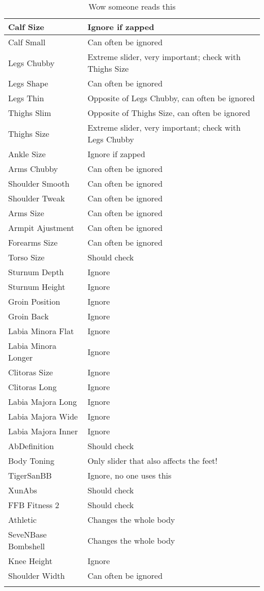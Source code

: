 \begin{longtable}{| p{} | p{} |}
    Calf Size & Ignore if zapped \\ \hline
    Calf Small & Can often be ignored \\ \hline
    Legs Chubby & Extreme slider, very important; check with Thighs Size \\ \hline
    Legs Shape & Can often be ignored \\ \hline
    Legs Thin & Opposite of Legs Chubby, can often be ignored \\ \hline
    Thighs Slim & Opposite of Thighs Size, can often be ignored \\ \hline
    Thighs Size & Extreme slider, very important; check with Legs Chubby \\ \hline
    Ankle Size & Ignore if zapped \\ \hline
    Arms Chubby & Can often be ignored \\ \hline
    Shoulder Smooth & Can often be ignored \\ \hline
    Shoulder Tweak & Can often be ignored \\ \hline
    Arms Size & Can often be ignored \\ \hline
    Armpit Ajustment & Can often be ignored \\ \hline
    Forearms Size & Can often be ignored \\ \hline
    Torso Size & Should check \\ \hline
    Sturnum Depth & Ignore \\ \hline
    Sturnum Height & Ignore \\ \hline
    Groin Position & Ignore \\ \hline
    Groin Back & Ignore \\ \hline
    Labia Minora Flat & Ignore \\ \hline
    Labia Minora Longer & Ignore \\ \hline
    Clitoras Size & Ignore \\ \hline
    Clitoras Long & Ignore \\ \hline
    Labia Majora Long & Ignore \\ \hline
    Labia Majora Wide & Ignore \\ \hline
    Labia Majora Inner & Ignore \\ \hline
    AbDefinition & Should check \\ \hline
    Body Toning & Only slider that also affects the feet! \\ \hline
    TigerSanBB & Ignore, no one uses this \\ \hline
    XunAbs & Should check \\ \hline
    FFB Fitness 2 & Should check \\ \hline
    Athletic & Changes the whole body \\ \hline
    SeveNBase Bombshell & Changes the whole body \\ \hline
    Knee Height & Ignore \\ \hline
    Shoulder Width & Can often be ignored \\ \hline
    \caption{Wow someone reads this}
\end{longtable}